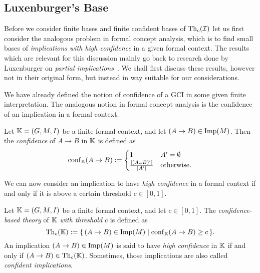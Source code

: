 \subsection{Luxenburger's Base}
\label{Luxen-base}

Before we consider finite bases and finite confident bases of $\operatorname{Th}_c(\mathcal{I})$ let us
first consider the analogous problem in formal concept analysis, which is to find small
bases of \emph{implications with high confidence} in a given formal context.  The results
which are relevant for this discussion mainly go back to research done by Luxenburger on
\emph{partial implications}~\cite{diss:Luxenburger,Luxenburger91}.  We shall first discuss
these results, however not in their original form, but instead in way suitable for our
considerations.

We have already defined the notion of confidence of a GCI in some given finite
interpretation.  The analogous notion in formal concept analysis is the confidence of an
implication in a formal context.

\begin{Definition}
  \label{def:confidence-of-implications}
  Let ${\mathbb{K}} = (G, M, I)$ be a finite formal context, and let $(A \to B) \in \operatorname{Imp}(M)$.
  Then the \emph{confidence} of $A \to B$ in ${\mathbb{K}}$ is defined as
  \begin{equation*}
    \operatorname{conf}_{{\mathbb{K}}}(A \to B) :=
    \begin{cases}
      1 & A' = \emptyset \\
      \frac{ \lvert (A \cup B)' \rvert } { \lvert A' \rvert } & \text{otherwise}.
    \end{cases}
  \end{equation*}
\end{Definition}

We can now consider an implication to have \emph{high confidence} in a formal context if
and only if it is above a certain threshold $c \in [0,1]$.

\begin{Definition}
  \label{def:theory-with-threshold-for-formal-contexts}
  Let ${\mathbb{K}} = (G, M, I)$ be a finite formal context, and let $c \in [0,1]$.  The
  \emph{confidence-based theory} of ${\mathbb{K}}$ \emph{with threshold $c$} is defined as
  \begin{equation*}
    \operatorname{Th}_c({\mathbb{K}}) := {\{\, (A \to B) \in \operatorname{Imp}(M) \mid \operatorname{conf}_{{\mathbb{K}}}(A \to B) \ge c \,\}}.
  \end{equation*}
  An implication $(A \to B) \in \operatorname{Imp}(M)$ is said to have \emph{high confidence} in ${\mathbb{K}}$ if and only if $(A \to B) \in \operatorname{Th}_c({\mathbb{K}})$.  Sometimes, those implications are also
  called \emph{confident implications}.
\end{Definition}

